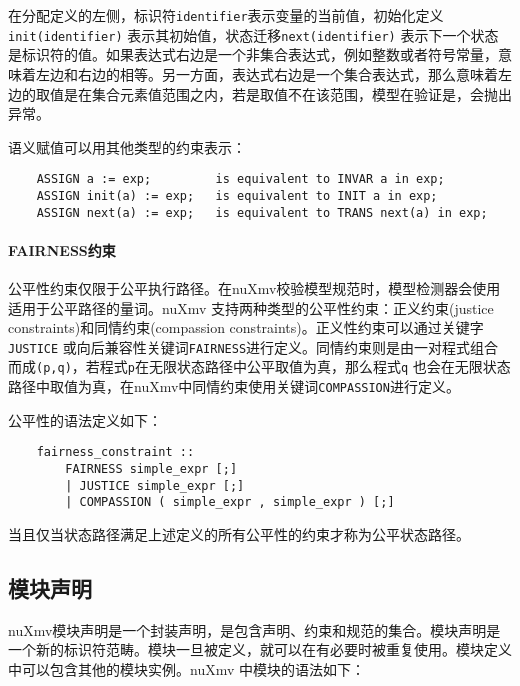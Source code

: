 在分配定义的左侧，标识符\verb|identifier|表示变量的当前值，初始化定义\verb|init(identifier)| 表示其初始值，状态迁移\verb|next(identifier)| 表示下一个状态是标识符的值。如果表达式右边是一个非集合表达式，例如整数或者符号常量，意味着左边和右边的相等。另一方面，表达式右边是一个集合表达式，那么意味着左边的取值是在集合元素值范围之内，若是取值不在该范围，模型在验证是，会抛出异常。

语义赋值可以用其他类型的约束表示：
\begin{lstlisting}
    ASSIGN a := exp;         is equivalent to INVAR a in exp;
    ASSIGN init(a) := exp;   is equivalent to INIT a in exp;
    ASSIGN next(a) := exp;   is equivalent to TRANS next(a) in exp;
\end{lstlisting}

\paragraph{FAIRNESS约束}
公平性约束仅限于公平执行路径。在nuXmv校验模型规范时，模型检测器会使用适用于公平路径的量词。nuXmv 支持两种类型的公平性约束：正义约束(justice constraints)和同情约束(compassion constraints)。正义性约束可以通过关键字\verb|JUSTICE| 或向后兼容性关键词\verb|FAIRNESS|进行定义。同情约束则是由一对程式组合而成\verb|(p,q)|，若程式\verb|p|在无限状态路径中公平取值为真，那么程式\verb|q| 也会在无限状态路径中取值为真，在nuXmv中同情约束使用关键词\verb|COMPASSION|进行定义。

公平性的语法定义如下：
\begin{lstlisting}
    fairness_constraint ::
        FAIRNESS simple_expr [;]
        | JUSTICE simple_expr [;]
        | COMPASSION ( simple_expr , simple_expr ) [;]
\end{lstlisting}

当且仅当状态路径满足上述定义的所有公平性的约束才称为公平状态路径。


\subsection{模块声明}
nuXmv模块声明是一个封装声明，是包含声明、约束和规范的集合。模块声明是一个新的标识符范畴。模块一旦被定义，就可以在有必要时被重复使用。模块定义中可以包含其他的模块实例。nuXmv 中模块的语法如下：

